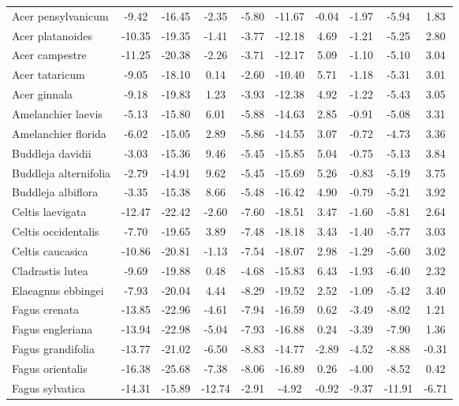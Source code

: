 \documentclass[11pt]{article}
\begin{document}
\begin{longtable}{p{1.50in}c{0.32in}c{0.32in}c{0.32in}c{0.32in}c{0.32in}c{0.32in}c{0.2in}c{0.3in}c{0.1in}}
  Acer pensylvanicum & -9.42 & -16.45 & -2.35 & -5.80 & -11.67 & -0.04 & -1.97 & -5.94 & 1.83 \\ 
  Acer platanoides & -10.35 & -19.35 & -1.41 & -3.77 & -12.18 & 4.69 & -1.21 & -5.25 & 2.80 \\ 
  Acer campestre & -11.25 & -20.38 & -2.26 & -3.71 & -12.17 & 5.09 & -1.10 & -5.10 & 3.04 \\ 
  Acer tataricum & -9.05 & -18.10 & 0.14 & -2.60 & -10.40 & 5.71 & -1.18 & -5.31 & 3.01 \\ 
  Acer ginnala & -9.18 & -19.83 & 1.23 & -3.93 & -12.38 & 4.92 & -1.22 & -5.43 & 3.05 \\ 
  Amelanchier laevis & -5.13 & -15.80 & 6.01 & -5.88 & -14.63 & 2.85 & -0.91 & -5.08 & 3.31 \\ 
  Amelanchier florida & -6.02 & -15.05 & 2.89 & -5.86 & -14.55 & 3.07 & -0.72 & -4.73 & 3.36 \\ 
  Buddleja davidii & -3.03 & -15.36 & 9.46 & -5.45 & -15.85 & 5.04 & -0.75 & -5.13 & 3.84 \\ 
  Buddleja alternifolia & -2.79 & -14.91 & 9.62 & -5.45 & -15.69 & 5.26 & -0.83 & -5.19 & 3.75 \\ 
  Buddleja albiflora & -3.35 & -15.38 & 8.66 & -5.48 & -16.42 & 4.90 & -0.79 & -5.21 & 3.92 \\ 
  Celtis laevigata & -12.47 & -22.42 & -2.60 & -7.60 & -18.51 & 3.47 & -1.60 & -5.81 & 2.64 \\ 
  Celtis occidentalis & -7.70 & -19.65 & 3.89 & -7.48 & -18.18 & 3.43 & -1.40 & -5.77 & 3.03 \\ 
  Celtis caucasica & -10.86 & -20.81 & -1.13 & -7.54 & -18.07 & 2.98 & -1.29 & -5.60 & 3.02 \\ 
  Cladrastis lutea & -9.69 & -19.88 & 0.48 & -4.68 & -15.83 & 6.43 & -1.93 & -6.40 & 2.32 \\ 
  Elaeagnus ebbingei & -7.93 & -20.04 & 4.44 & -8.29 & -19.52 & 2.52 & -1.09 & -5.42 & 3.40 \\ 
  Fagus crenata & -13.85 & -22.96 & -4.61 & -7.94 & -16.59 & 0.62 & -3.49 & -8.02 & 1.21 \\ 
  Fagus engleriana & -13.94 & -22.98 & -5.04 & -7.93 & -16.88 & 0.24 & -3.39 & -7.90 & 1.36 \\ 
  Fagus grandifolia & -13.77 & -21.02 & -6.50 & -8.83 & -14.77 & -2.89 & -4.52 & -8.88 & -0.31 \\ 
  Fagus orientalis & -16.38 & -25.68 & -7.38 & -8.06 & -16.89 & 0.26 & -4.00 & -8.52 & 0.42 \\ 
  Fagus sylvatica & -14.31 & -15.89 & -12.74 & -2.91 & -4.92 & -0.92 & -9.37 & -11.91 & -6.71 \\ 

\end{longtable}
\end{document}
